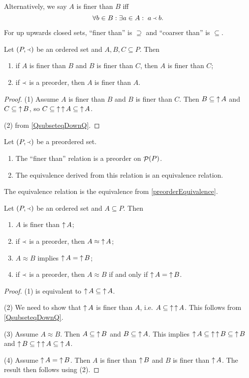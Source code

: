 Alternatively, we say $A$ is finer than $B$ iff
\[ \forall b\in B: \exists a\in A: \; a \Yleft b. \]

For up upwards closed sets, ``finer than'' is $\supseteq$ and ``coarser than'' is $\subseteq$.

\begin{lemma}
Let $\left( P,\Yleft \right)$ be an ordered set and $A,B,C \subseteq P$. Then
\begin{enumerate}
\item if $A$ is finer than $B$ and $B$ is finer than $C$, then $A$ is finer than $C$;
\item if $\Yleft$ is a preorder, then $A$ is finer than $A$.
\end{enumerate}
\end{lemma}
\begin{proof}
(1) Assume $A$ is finer than $B$ and $B$ is finer than $C$. Then $B \subseteq \mathop{\uparrow} A$ and $C\subseteq \mathop{\uparrow} B$, so $C \subseteq \mathop{\uparrow}\mathop{\uparrow} A \subseteq \mathop{\uparrow} A$.

(2) from \ref{QsubseteqDownQ}.
\end{proof}
\begin{corollary}
Let $\left( P,\Yleft \right)$ be a preordered set.
\begin{enumerate}
\item The ``finer than'' relation is a preorder on $\mathop{\mathcal{P}}(P)$.
\item The equivalence derived from this relation is an equivalence relation.
\end{enumerate}
\end{corollary}
The equivalence relation is the equivalence from \ref{preorderEquivalence}.

\begin{lemma}
Let $\left( P,\Yleft \right)$ be an ordered set and $A \subseteq P$. Then
\begin{enumerate}
\item $A$ is finer than $\mathop{\uparrow} A$;
\item if $\Yleft$ is a preorder, then $A \approx \mathop{\uparrow} A$;
\item $A \approx B$ implies $\mathop{\uparrow} A = \mathop{\uparrow} B$;
\item if $\Yleft$ is a preorder, then $A \approx B$ \textup{if and only if} $\mathop{\uparrow} A = \mathop{\uparrow} B$.
\end{enumerate}
\end{lemma}
\begin{proof}
(1) is equivalent to $\mathop{\uparrow} A \subseteq \mathop{\uparrow} A$.

(2) We need to show that $\mathop{\uparrow} A$ is finer than $A$, i.e. $A\subseteq \mathop{\uparrow}\mathop{\uparrow} A$. This follows from \ref{QsubseteqDownQ}.

(3) Assume $A \approx B$. Then $A \subseteq \mathop{\uparrow} B$ and $B \subseteq \mathop{\uparrow} A$. This implies $\mathop{\uparrow} A \subseteq \mathop{\uparrow}\mathop{\uparrow} B \subseteq \mathop{\uparrow} B$ and $\mathop{\uparrow} B \subseteq \mathop{\uparrow}\mathop{\uparrow} A \subseteq \mathop{\uparrow} A$.

(4) Assume $\mathop{\uparrow} A = \mathop{\uparrow} B$. Then $A$ is finer than $\mathop{\uparrow} B$ and $B$ is finer than $\mathop{\uparrow} A$. The result then follows using (2).
\end{proof}


